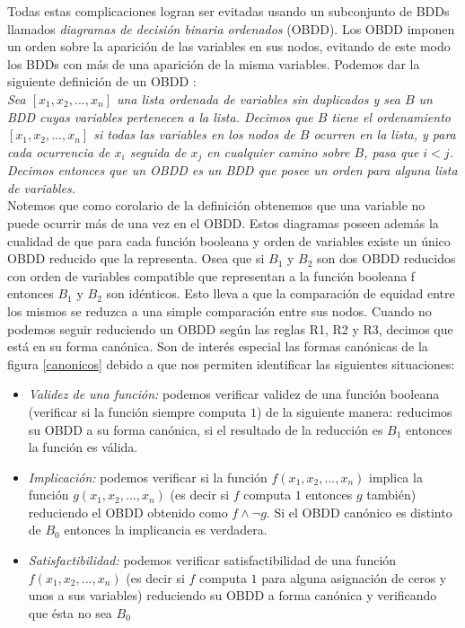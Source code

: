 \documentclass[titlepage, 12pt]{book}
\begin{document}
Todas estas complicaciones logran ser evitadas usando un subconjunto de BDDs llamados \textit{diagramas de decisi\'on binaria ordenados} (OBDD). Los OBDD imponen un orden sobre la aparici\'on de las variables en sus nodos, evitando de este modo los BDDs con m\'as de una aparici\'on de la misma variables. Podemos dar la siguiente definici\'on de un OBDD \cite{Huth}:\\

\textit{Sea $[x_1,x_2,...,x_n]$ una lista ordenada de variables sin duplicados y sea $B$ un BDD cuyas variables pertenecen a la lista. Decimos que $B$ tiene el ordenamiento $[x_1,x_2,...,x_n]$ si todas las variables en los nodos de $B$ ocurren en la lista, y para cada ocurrencia de $x_i$ seguida de $x_j$ en cualquier camino sobre $B$, pasa que $i < j$. Decimos entonces que un OBDD es un BDD que posee un orden para alguna lista de variables.}\\

Notemos que como corolario de la definici\'on obtenemos que una variable no puede ocurrir m\'as de una vez en el OBDD. Estos diagramas poseen adem\'as la cualidad de que para cada funci\'on booleana y orden de variables existe un \'unico OBDD reducido que la representa. Osea que si $B_1$ y $B_2$ son dos OBDD reducidos con orden de variables compatible que representan a la funci\'on booleana f entonces $B_1$ y $B_2$ son id\'enticos. Esto lleva a que la comparaci\'on de equidad entre los mismos se reduzca a una simple comparaci\'on entre sus nodos. Cuando no podemos seguir reduciendo un OBDD seg\'un las reglas R1, R2 y R3, decimos que est\'a en su forma can\'onica. Son de inter\'es especial las formas can\'onicas de la figura \ref{canonicos} debido a que nos permiten identificar las siguientes situaciones:

\begin{itemize}
\item \textit{Validez de una funci\'on:} podemos verificar validez de una funci\'on booleana (verificar si la funci\'on siempre computa $1$) de la siguiente manera: reducimos su OBDD a su forma can\'onica, si el resultado de la reducci\'on es $B_1$ entonces la funci\'on es v\'alida.
\item \textit{Implicaci\'on:} podemos verificar si la funci\'on $f(x_1,x_2,...,x_n)$ implica la funci\'on $g(x_1,x_2,...,x_n)$ (es decir si $f$ computa $1$ entonces $g$ tambi\'en) reduciendo el OBDD obtenido como $f \wedge \neg g$. Si el OBDD can\'onico es distinto de $B_0$ entonces la implicancia es verdadera.
\item \textit{Satisfactibilidad:} podemos verificar satisfactibilidad de una funci\'on $f(x_1,x_2,...,x_n)$ (es decir si $f$ computa $1$ para alguna asignaci\'on de ceros y unos a sus variables) reduciendo su OBDD a forma can\'onica y verificando que \'esta no sea $B_0$
\end{itemize}
\end{document}

